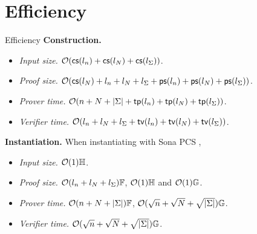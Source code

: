 \section{Efficiency}
\begin{frame}{Efficiency}
	\textbf{Construction.}
	\begin{itemize}
		\item \textit{Input size.}  $\mathcal{O}(\mathsf{cs}(l_n)+ \mathsf{cs}(l_N)+\mathsf{cs}(l_\Sigma) )$.
		\item \textit{Proof size.} $
		\mathcal{O}(\mathsf{cs}(l_N) +l_n +l_N+l_\Sigma+ \mathsf{ps}(l_n)+  \mathsf{ps}(l_N) + \mathsf{ps}(l_\Sigma) )
		$.
		\item \textit{Prover time.} 
		$
		\mathcal{O}(n+N + \left|\Sigma\right| + \mathsf{tp}(l_n)+  \mathsf{tp}(l_N)+\mathsf{tp}(l_\Sigma) )
		$.
		\item \textit{Verifier time.} 
		$
		\mathcal{O}(l_n + l_N + l_\Sigma + \mathsf{tv}(l_n) + \mathsf{tv}(l_N)+\mathsf{tv}(l_\Sigma) )
		$.
	\end{itemize}
	
	\smallskip\noindent\textbf{Instantiation.} When instantiating with Sona PCS \cite{EC:SetThaWah23b}, 
	\begin{itemize}
		\item \textit{Input size.} $\mathcal{O}(1) \mathbb{H}$.
		\item \textit{Proof size.} $\mathcal{O}(l_n + l_N + l_\Sigma)\mathbb{F}$, $\mathcal{O}(1) \mathbb{H}$ and $\mathcal{O}(1) \mathbb{G}$.
		\item \textit{Prover time.} $\mathcal{O}(n+N+ \left|\Sigma\right|) \mathbb{F}$, $\mathcal{O}(\sqrt{n}+ \sqrt{N} +\sqrt{\left|\Sigma\right|} ) \mathbb{G}$.
		\item \textit{Verifier time.} $\mathcal{O}(\sqrt{n}+ \sqrt{N} +\sqrt{\left|\Sigma\right|}) \mathbb{G}$.
	\end{itemize}
\end{frame}